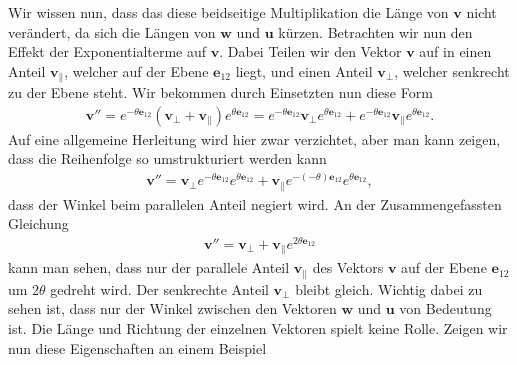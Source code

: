 Wir wissen nun, dass das diese beidseitige Multiplikation die Länge von $\mathbf{v}$ nicht verändert, da sich die Längen von $\mathbf{w}$ und $\mathbf{u}$ kürzen. Betrachten wir nun den Effekt der Exponentialterme auf $\mathbf{v}$. Dabei Teilen wir den Vektor $\mathbf{v}$ auf in einen Anteil $\mathbf{v_\parallel}$, welcher auf der Ebene $\mathbf{e}_{12}$ liegt, und einen Anteil $\mathbf{v_\perp}$, welcher senkrecht zu der Ebene steht. Wir bekommen durch Einsetzten nun diese Form
\begin{align} \label{RotAufPerpPar}
	\mathbf{v}'' = e^{-\theta \mathbf{e}_{12}} (\mathbf{v_\perp + v_\parallel}) e^{\theta \mathbf{e}_{12}} = e^{-\theta \mathbf{e}_{12}} \mathbf{v_\perp} e^{\theta \mathbf{e}_{12}} + e^{-\theta \mathbf{e}_{12}} \mathbf{v_\parallel} e^{\theta \mathbf{e}_{12}}.
\end{align}
Auf eine allgemeine Herleitung wird hier zwar verzichtet, aber man kann zeigen, dass die Reihenfolge so umstrukturiert werden kann
\begin{align}
	\mathbf{v}'' = \mathbf{v_\perp} e^{-\theta \mathbf{e}_{12}}  e^{\theta \mathbf{e}_{12}} +  \mathbf{v_\parallel} e^{-(-\theta) \mathbf{e}_{12}} e^{\theta \mathbf{e}_{12}},
\end{align}
dass der Winkel beim parallelen Anteil negiert wird. An der Zusammengefassten Gleichung
\begin{align}\label{RotParPerp}
	\mathbf{v}'' = \mathbf{v_\perp} +  \mathbf{v_\parallel} e^{2\theta \mathbf{e}_{12}}
\end{align}
kann man sehen, dass nur der parallele Anteil $\mathbf{v_\parallel}$ des Vektors $\mathbf{v}$ auf der Ebene $\mathbf{e}_{12}$ um $2\theta$ gedreht wird. Der senkrechte Anteil $\mathbf{v_\perp}$ bleibt gleich. Wichtig dabei zu sehen ist, dass nur der Winkel zwischen den Vektoren $\mathbf{w}$ und $\mathbf{u}$ von Bedeutung ist. Die Länge und Richtung der einzelnen Vektoren spielt keine Rolle. Zeigen wir nun diese Eigenschaften an einem Beispiel
